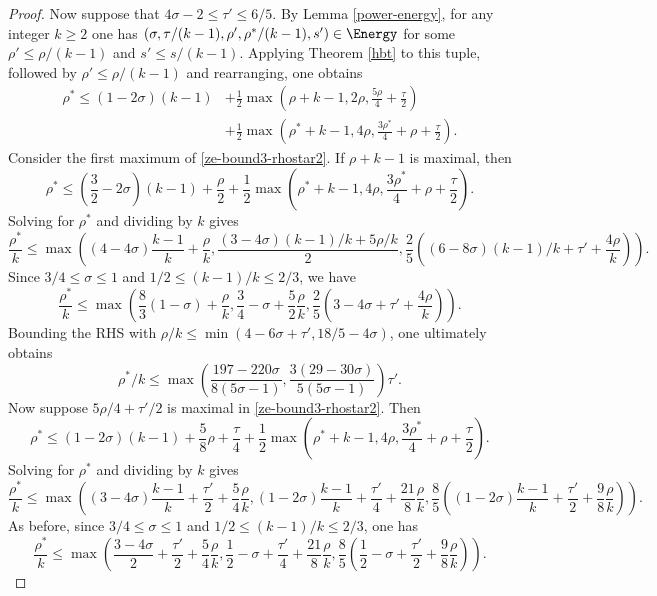 \begin{proof}
Now suppose that $4\sigma - 2 \le \tau' \le 6/5$. By Lemma \ref{power-energy}, for any integer $k \ge 2$ one has $(\sigma, \tau/(k - 1), \rho', \rho^*/(k - 1), s') \in \Energy$ for some $\rho' \le \rho/(k - 1)$ and $s' \le s/(k - 1)$. Applying Theorem \ref{hbt} to this tuple, followed by $\rho' \le \rho/(k - 1)$ and rearranging, one obtains
\begin{equation}\label{ze-bound3-rhostar2}
\begin{split}
\rho^* \le (1-2\sigma)(k - 1) &+ \frac{1}{2}\max(\rho+k - 1, 2\rho, \frac{5\rho}{4} + \frac{\tau}{2}) \\
&+ \frac{1}{2}\max(\rho^*+k - 1, 4\rho, \frac{3\rho^*}{4} + \rho+\frac{\tau}{2}).
\end{split}
\end{equation}
Consider the first maximum of \eqref{ze-bound3-rhostar2}. If $\rho + k - 1$ is maximal, then
\[
\rho^* \le (\frac{3}{2} - 2\sigma)(k - 1) + \frac{\rho}{2} + \frac{1}{2}\max(\rho^*+k - 1, 4\rho, \frac{3\rho^*}{4} + \rho+\frac{\tau}{2}).
\]
Solving for $\rho^*$ and dividing by $k$ gives
\[
\frac{\rho^*}{k} \le \max((4 - 4\sigma)\frac{k - 1}{k} + \frac{\rho}{k}, \frac{(3 - 4\sigma)(k - 1)/k + 5\rho/k}{2}, \frac{2}{5}((6 - 8\sigma)(k - 1)/k + \tau' + \frac{4\rho}{k})).
\]
Since $3/4 \le \sigma \le 1$ and $1/2 \le (k - 1)/k \le 2/3$, we have
\[
\frac{\rho^*}{k} \le \max\left(\frac{8}{3}(1 - \sigma) + \frac{\rho}{k}, \frac{3}{4} - \sigma + \frac{5}{2}\frac{\rho}{k}, \frac{2}{5}(3 - 4\sigma + \tau' + \frac{4\rho}{k})\right).
\]
Bounding the RHS with $\rho/k \le \min(4 - 6\sigma + \tau', 18/5 - 4\sigma)$, one ultimately obtains
\[
\rho^*/k \le \max\left(\frac{197 - 220\sigma}{8(5\sigma - 1)}, \frac{3(29 - 30\sigma)}{5(5\sigma - 1)}\right)\tau'.
\]
Now suppose $5\rho/4 + \tau'/2$ is maximal in \eqref{ze-bound3-rhostar2}. Then
\[
\rho^* \le (1 - 2\sigma)(k - 1) + \frac{5}{8}\rho + \frac{\tau}{4} + \frac{1}{2}\max(\rho^*+k - 1, 4\rho, \frac{3\rho^*}{4} + \rho+\frac{\tau}{2}).
\]
Solving for $\rho^*$ and dividing by $k$ gives
\[
\frac{\rho^*}{k} \le \max((3 - 4\sigma)\frac{k - 1}{k} + \frac{\tau'}{2} + \frac{5}{4}\frac{\rho}{k}, (1 - 2\sigma)\frac{k - 1}{k} + \frac{\tau'}{4} + \frac{21}{8}\frac{\rho}{k}, \frac{8}{5}((1 - 2\sigma)\frac{k - 1}{k} + \frac{\tau'}{2} + \frac{9}{8}\frac{\rho}{k})).
\]
As before, since $3/4 \le \sigma \le 1$ and $1/2 \le (k - 1)/k \le 2/3$, one has
\[
\frac{\rho^*}{k} \le \max(\frac{3 - 4\sigma}{2} + \frac{\tau'}{2} + \frac{5}{4}\frac{\rho}{k}, \frac{1}{2} - \sigma + \frac{\tau'}{4} + \frac{21}{8}\frac{\rho}{k}, \frac{8}{5}(\frac{1}{2} - \sigma + \frac{\tau'}{2} + \frac{9}{8}\frac{\rho}{k})).
\]
\end{proof}
